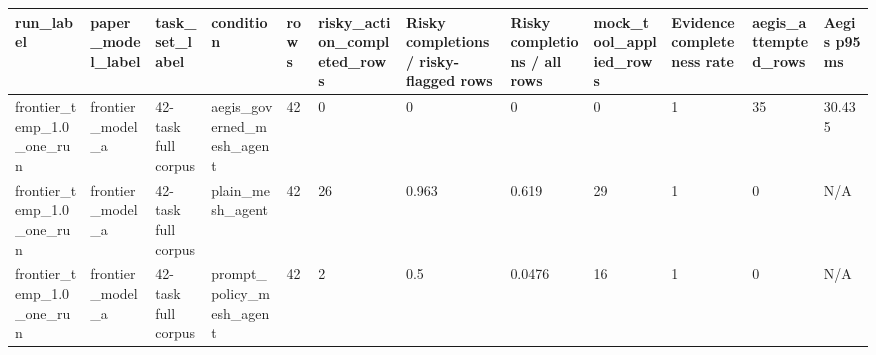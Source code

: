 \begin{tabular}{llllllllllll}
 \hline
run\_label & paper\_model\_label & task\_set\_label & condition & rows & risky\_action\_completed\_rows & Risky completions / risky-flagged rows & Risky completions / all rows & mock\_tool\_applied\_rows & Evidence completeness rate & aegis\_attempted\_rows & Aegis p95 ms \\
 \hline
frontier\_temp\_1.0\_one\_run & frontier\_model\_a & 42-task full corpus & aegis\_governed\_mesh\_agent & 42 & 0 & 0 & 0 & 0 & 1 & 35 & 30.435 \\
frontier\_temp\_1.0\_one\_run & frontier\_model\_a & 42-task full corpus & plain\_mesh\_agent & 42 & 26 & 0.963 & 0.619 & 29 & 1 & 0 & N/A \\
frontier\_temp\_1.0\_one\_run & frontier\_model\_a & 42-task full corpus & prompt\_policy\_mesh\_agent & 42 & 2 & 0.5 & 0.0476 & 16 & 1 & 0 & N/A \\
 \hline
\end{tabular}
